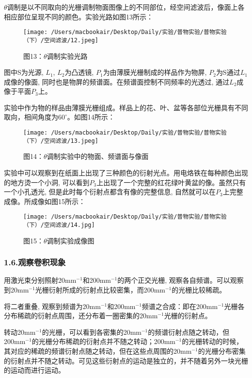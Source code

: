 \documentclass[23pt,a4paper,two column]{article}
\begin{document}
$\theta$调制是以不同取向的光栅调制物面图像上的不同部位，经空间滤波后，像面上各相应部位呈现不同的颜色。实验光路如图13所示：
\begin{figure}[H]
\centering
\texttt{[image: /Users/macbookair/Desktop/Daily/实验/普物实验/普物实验（下）/空间滤波/12.jpeg]}
\caption*{图13：$\theta$调制实验光路}
\end{figure}

图中S为光源, $L_1$, $L_2$为凸透镜, $P_1$为由薄膜光栅制成的样品作为物屏, $P_2$为S通过$L_1$成像的像面, 同时也是物屏的频谱面。在频谱面控制不同频率的光透过, 通过$L_2$成像于平面$P_3$上。
	
实验中作为物的样品由薄膜光栅组成。样品上的花、叶、盆等各部位光栅具有不同取向，相间角度为$60^\circ$。如图14所示：
\begin{figure}[H]
\centering
\texttt{[image: /Users/macbookair/Desktop/Daily/实验/普物实验/普物实验（下）/空间滤波/13.jpeg]}
\caption*{图14：$\theta$调制实验中的物面、频谱面与像面}
\end{figure}

实验中可以观察到在纸面上出现了三种颜色的衍射光点。用电烙铁在每种颜色出现的地方烫一个小洞, 可以看到$P_3$上出现了一个完整的红花绿叶黄盆的像。虽然只有一个小孔透光, 但是此时每个衍射点都含有像的完整信息, 自然就可以在$P_3$上完整成像。所成像如图15所示：
\begin{figure}[H]
\centering
\texttt{[image: /Users/macbookair/Desktop/Daily/实验/普物实验/普物实验（下）/空间滤波/14.jpg]}
\caption*{图15：$\theta$调制实验成像图}
\end{figure}

\subsubsection*{1.6.观察卷积现象}

用激光束分别照射20mm$^{-1}$和200mm$^{-1}$的两个正交光栅, 观察各自频谱。可以观察到20mm$^{-1}$光栅衍射所成的衍射点比较密集，而200mm$^{-1}$的光栅比较稀疏。
	
将二者重叠, 观察到频谱为20mm$^{-1}$和200mm$^{-1}$频谱之合成：即在200mm$^{-1}$光栅各分布稀疏的衍射点周围，还分布着一圈密集的20mm$^{-1}$光栅的衍射点。

转动20mm$^{-1}$的光栅，可以看到各密集的20mm$^{-1}$的频谱衍射点随之转动，但200mm$^{-1}$的光栅分布稀疏的衍射点并不随之转动；200mm$^{-1}$的光栅转动的时候，其对应的稀疏的频谱衍射点随之转动，但在这些点周围的20mm$^{-1}$的光栅分布密集的衍射点并不随之转动。可见这些衍射点的运动是独立的，并不随着另外一块光栅的运动而进行运动。
\end{document}
